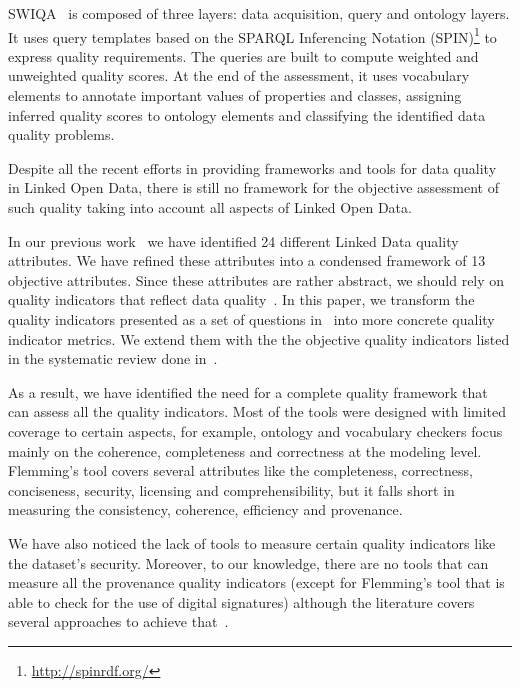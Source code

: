\documentclass[onecolumn, crcready]{../../Util/LaTEX/iosart2c}
\begin{document}
SWIQA~\cite{Furber:ECIS:11} is composed of three layers: data acquisition, query and ontology layers. It uses query templates based on the SPARQL Inferencing Notation (SPIN)\footnote{\url{http://spinrdf.org/}} to express quality requirements. The queries are built to compute weighted and unweighted quality scores. At the end of the assessment, it uses vocabulary elements to annotate important values of properties and classes, assigning inferred quality scores to ontology elements and classifying the identified data quality problems.

Despite all the recent efforts in providing frameworks and tools for data quality in Linked Open Data, there is still no framework for the objective assessment of such quality taking into account all aspects of Linked Open Data.

In our previous work~\cite{Assaf:DQMST:12} we have identified 24 different Linked Data quality attributes. We have refined these attributes into a condensed framework of 13 objective attributes. Since these attributes are rather abstract, we should rely on quality indicators that reflect data quality~\cite{Flemming:Thesis:10}. In this paper, we transform the quality indicators presented as a set of questions in~\cite{Assaf:DQMST:12} into more concrete quality indicator metrics. We extend them with the the objective quality indicators listed in the systematic review done in~\cite{Zaveri:SemWebJorunal:12}.

As a result, we have identified the need for a complete quality framework that can assess all the quality indicators. Most of the tools were designed with limited coverage to certain aspects, for example, ontology and vocabulary checkers focus mainly on the coherence, completeness and correctness at the modeling level. Flemming's tool covers several attributes like the completeness, correctness, conciseness, security, licensing and comprehensibility, but it falls short in measuring the consistency, coherence, efficiency and provenance.

We have also noticed the lack of tools to measure certain quality indicators like the dataset's security. Moreover, to our knowledge, there are no tools that can measure all the provenance quality indicators (except for Flemming's tool that is able to check for the use of digital signatures) although the literature covers several approaches to achieve that~\cite{Hartig:ISWC:09}\cite{Flouris:EvoDyn:12}\cite{Harth:ISWC:09}.

\end{document}
